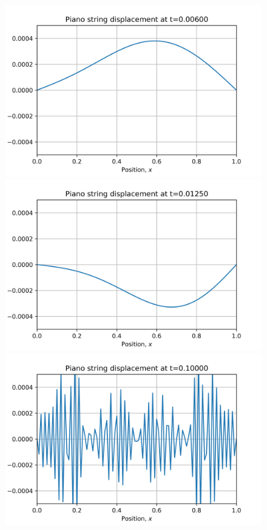 \documentclass{article}
\begin{document}
\begin{figure}[H]
\begin{minipage}[b]{0.33\linewidth}
    	\includegraphics[width=1.0\linewidth]{../images/Lab08_t=6ms.png}
  	\end{minipage}
  	\begin{minipage}[b]{0.33\linewidth}
    	\includegraphics[width=1.0\linewidth]{../images/Lab08_t=12ms.png} 
  	\end{minipage}
  	\begin{minipage}[b]{0.33\linewidth}
  		\includegraphics[width=1.0\linewidth]{../images/Lab08_t=100ms.png}

\end{minipage}
\end{figure}
\end{document}
